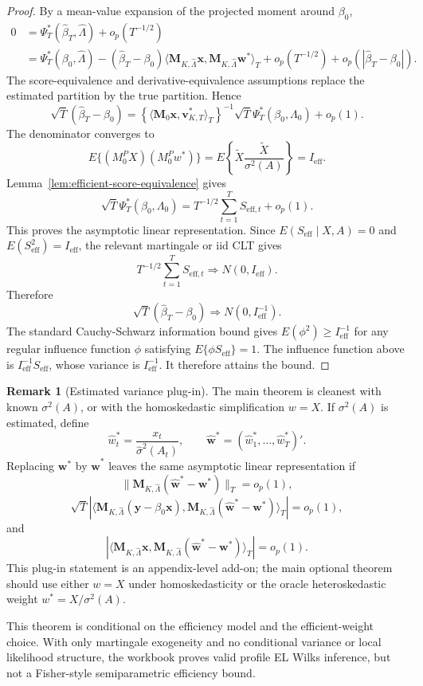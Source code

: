 \documentclass[12pt]{article}
\numberwithin{equation}{section}
\theoremstyle{definition}
\newtheorem{remark}{Remark}
\newcommand{\op}{o_p}
\newcommand{\innerT}[2]{\langle #1,#2\rangle_T}
\begin{document}
\begin{proof}
By a mean-value expansion of the projected moment around \(\beta_0\),
\[
\begin{aligned}
    0
    &=\Psi_T^*(\widehat\beta_T,\widehat\Lambda)+\op(T^{-1/2}) \\
    &=\Psi_T^*(\beta_0,\widehat\Lambda)
      -(\widehat\beta_T-\beta_0)
       \innerT{\bm M_{K,\widehat\Lambda}\bm x}
               {\bm M_{K,\widehat\Lambda}\bm w^*}
      +\op(T^{-1/2})+
       \op(|\widehat\beta_T-\beta_0|).
\end{aligned}
\]
The score-equivalence and derivative-equivalence assumptions replace the
estimated partition by the true partition. Hence
\[
    \sqrt T(\widehat\beta_T-\beta_0)
    =\left\{\innerT{\bm M_0\bm x}{\bm v_{K,T}^*}\right\}^{-1}
      \sqrt T\Psi_T^*(\beta_0,\Lambda_0)+\op(1).
\]
The denominator converges to
\[
    E\{(M_0^PX)(M_0^Pw^*)\}
    =E\left\{\widetilde X\frac{\widetilde X}{\sigma^2(A)}\right\}
    =I_{\mathrm{eff}}.
\]
Lemma~\ref{lem:efficient-score-equivalence} gives
\[
    \sqrt T\Psi_T^*(\beta_0,\Lambda_0)
    =T^{-1/2}\sum_{t=1}^T S_{\mathrm{eff},t}+\op(1).
\]
This proves the asymptotic linear representation. Since
\(E(S_{\mathrm{eff}}\mid X,A)=0\) and
\(E(S_{\mathrm{eff}}^2)=I_{\mathrm{eff}}\), the relevant martingale or iid CLT
gives
\[
    T^{-1/2}\sum_{t=1}^T S_{\mathrm{eff},t}
    \Rightarrow N(0,I_{\mathrm{eff}}).
\]
Therefore
\[
    \sqrt T(\widehat\beta_T-\beta_0)
    \Rightarrow N(0,I_{\mathrm{eff}}^{-1}).
\]
The standard Cauchy-Schwarz information bound gives
\(E(\phi^2)\ge I_{\mathrm{eff}}^{-1}\) for any regular influence function
\(\phi\) satisfying \(E\{\phi S_{\mathrm{eff}}\}=1\). The influence function
above is \(I_{\mathrm{eff}}^{-1}S_{\mathrm{eff}}\), whose variance is
\(I_{\mathrm{eff}}^{-1}\). It therefore attains the bound.
\end{proof}

\begin{remark}[Estimated variance plug-in]
The main theorem is cleanest with known \(\sigma^2(A)\), or with the
homoskedastic simplification \(w=X\). If \(\sigma^2(A)\) is estimated, define
\[
    \widehat w_t^*=\frac{x_t}{\widehat\sigma^2(A_t)},
    \qquad
    \widehat{\bm w}^*=(\widehat w_1^*,\ldots,\widehat w_T^*)'.
\]
Replacing \(\bm w^*\) by \(\widehat{\bm w}^*\) leaves the same asymptotic linear
representation if
\[
    \|\bm M_{K,\widehat\Lambda}(\widehat{\bm w}^*-\bm w^*)\|_T=\op(1),
\]
\[
    \sqrt T\left|\innerT{\bm M_{K,\widehat\Lambda}(\bm y-\beta_0\bm x)}
    {\bm M_{K,\widehat\Lambda}(\widehat{\bm w}^*-\bm w^*)}\right|=\op(1),
\]
and
\[
    \left|\innerT{\bm M_{K,\widehat\Lambda}\bm x}
    {\bm M_{K,\widehat\Lambda}(\widehat{\bm w}^*-\bm w^*)}\right|=\op(1).
\]
This plug-in statement is an appendix-level add-on; the main optional theorem
should use either \(w=X\) under homoskedasticity or the oracle heteroskedastic
weight \(w^*=X/\sigma^2(A)\).
\end{remark}
This theorem is conditional on the efficiency model and the efficient-weight
choice. With only martingale exogeneity and no conditional variance or local
likelihood structure, the workbook proves valid profile EL Wilks inference, but
not a Fisher-style semiparametric efficiency bound.
\end{document}
